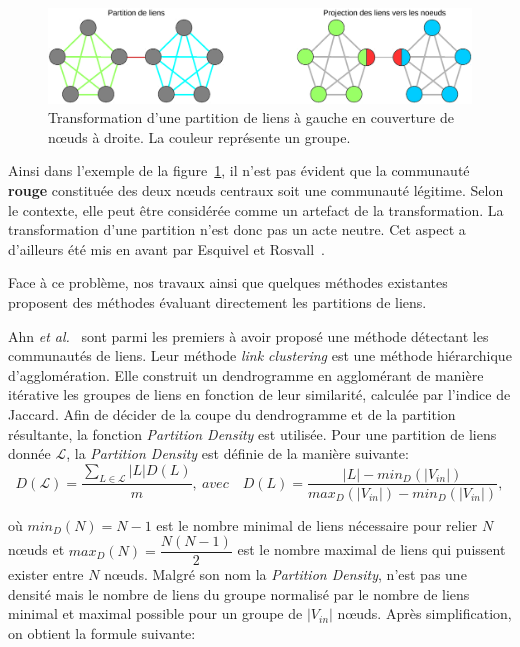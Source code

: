 \begin{figure}
\centering
\includegraphics[width=0.9\linewidth]{img/ExpectedNodes/Partition_Couverture}
\caption{Transformation d'une partition de liens à gauche en couverture de n\oe{}uds à droite. La couleur représente un groupe.}
\label{fig:Partition_Couverture}
\end{figure}


Ainsi dans l'exemple de la figure~\ref{fig:Partition_Couverture}, il n'est pas évident que la communauté \textcolor{briquered}{\textbf{rouge}} constituée des deux n\oe{}uds centraux soit une communauté légitime.
Selon le contexte, elle peut être considérée comme un artefact de la transformation.
La transformation d'une partition n'est donc pas un acte neutre.
Cet aspect a d'ailleurs été mis en avant par Esquivel et Rosvall~\cite{Esquivel2011}.

Face à ce problème, nos travaux ainsi que quelques méthodes existantes proposent des méthodes évaluant directement les partitions de liens.

Ahn \emph{et al.}~\cite{Ahn2010a} sont parmi les premiers à avoir proposé une méthode détectant les communautés de liens.
Leur méthode \emph{link clustering} est une méthode hiérarchique d'agglomération.
Elle construit un dendrogramme en agglomérant de manière itérative les groupes de liens en fonction de leur similarité, calculée par l'indice de Jaccard.
Afin de décider de la coupe du dendrogramme et de la partition résultante, la fonction \emph{Partition Density} est utilisée.
Pour une partition de liens donnée $\mathcal{L}$, la \emph{Partition Density} est définie de la manière suivante:
\begin{equation}
D(\mathcal{L}) = \dfrac{\sum_{L \in \mathcal{L}}|L|D(L)}{m},\ avec \quad  D(L) = \dfrac{|L|- min_D(|V_{in}|) }{max_D(|V_{in}|) - min_D(|V_{in}|)},
\end{equation}

où $min_D(N) = N - 1$ est le nombre minimal de liens nécessaire pour relier $N$ n\oe{}uds et $max_D(N) = \dfrac{N(N - 1)}{2}$ est le nombre maximal de liens qui puissent exister entre $N$ n\oe{}uds.
Malgré son nom la \emph{Partition Density}, n'est pas une densité mais le nombre de liens du groupe normalisé par le nombre de liens minimal et maximal possible pour un groupe de $|V_{in}|$ n\oe{}uds.
Après simplification, on obtient la formule suivante:

